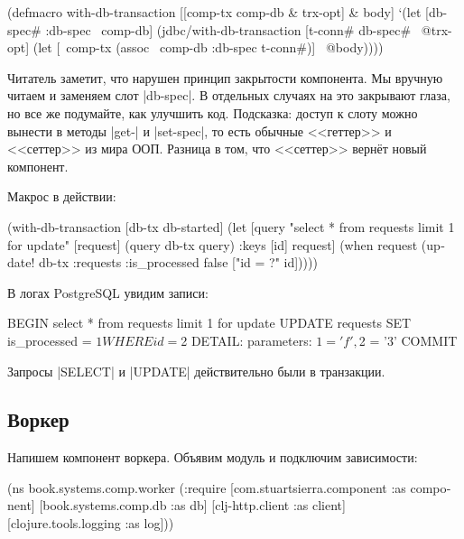 \begin{english}
  \begin{clojure}
(defmacro with-db-transaction
  [[comp-tx comp-db & trx-opt] & body]
  `(let [{db-spec# :db-spec} ~comp-db]
     (jdbc/with-db-transaction
       [t-conn# db-spec# ~@trx-opt]
       (let [~comp-tx (assoc ~comp-db :db-spec t-conn#)]
         ~@body))))
  \end{clojure}
\end{english}

Читатель заметит, что нарушен принцип закрытости компонента. Мы вручную читаем и
заменяем слот \spverb|db-spec|. В отдельных случаях на это закрывают глаза,
но все же подумайте, как улучшить код. Подсказка: доступ к слоту можно вынести в
методы \spverb|get-| и \spverb|set-spec|, то есть обычные <<геттер>> и
<<сеттер>> из мира ООП. Разница в том, что <<сеттер>> верн\"{е}т новый компонент.

Макрос в действии:

\begin{english}
  \begin{clojure}
(with-db-transaction
  [db-tx db-started]
  (let [query "select * from requests limit 1 for update"
        [request] (query db-tx query)
        {:keys [id]} request]
    (when request
      (update! db-tx :requests
               {:is_processed false}
               ["id = ?" id]))))
  \end{clojure}
\end{english}

\noindent
В логах PostgreSQL увидим записи:

\begin{english}
  \begin{sql}
BEGIN
select * from requests limit 1 for update
UPDATE requests SET is_processed = $1 WHERE id = $2
DETAIL:  parameters: $1 = 'f', $2 = '3'
COMMIT
  \end{sql}
\end{english}

\noindent
Запросы \spverb|SELECT| и \spverb|UPDATE| действительно были в транзакции.

\subsection{Воркер}

Напишем компонент воркера. Объявим модуль и подключим зависимости:

\begin{english}
  \begin{clojure}
(ns book.systems.comp.worker
  (:require
   [com.stuartsierra.component :as component]
   [book.systems.comp.db :as db]
   [clj-http.client :as client]
   [clojure.tools.logging :as log]))
  \end{clojure}
\end{english}

